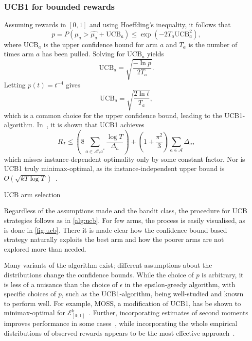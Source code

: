 \subsubsection{UCB1 for bounded rewards}
Assuming rewards in $[0,1]$ and using Hoeffding's inequality, it follows that
\begin{equation}
    p
    = P(\mu_a > \hat{\mu_a} + \text{UCB}_a)
    \leq \exp(-2T_a \text{UCB}_a^2),
\end{equation}
where $\text{UCB}_a$ is the upper confidence bound for arm $a$ and $T_a$ is the number of times arm $a$ has been pulled.
Solving for $\text{UCB}_a$ yields
\begin{equation}
    \text{UCB}_a = \sqrt{\frac{-\ln p}{2T_a}}.
\end{equation}
Letting $p(t) = t^{-4}$ gives
\begin{equation}
    \text{UCB}_a = \sqrt{\frac{2 \ln t}{T_a}},
\end{equation}
which is a common choice for the upper confidence bound, leading to the UCB1-algorithm.
In~\autocite{auer2002}, it is shown that UCB1 achieves
\begin{equation}
    R_T
    \leq
    \left( 8 \sum_{a \in \mathcal{A} \setminus a^*} \frac{\log T}{\Delta_a} \right)
    + \left(1 + \frac{\pi^2}{3}\right) \sum_{a \in \mathcal{A}} \Delta_a,
\end{equation}
which misses instance-dependent optimality only by some constant factor.
Nor is UCB1 truly minimax-optimal, as its instance-independent upper bound is $O(\sqrt{kT \log T})$~\autocite{bubeck2012}.

\begin{algorithm}
    \caption{UCB arm selection}
    \label{alg:ucb}
     
\end{algorithm}


Regardless of the assumptions made and the bandit class, the procedure for UCB strategies follows as in \cref{alg:ucb}.
For few arms, the process is easily visualised, as is done in \cref{fig:ucb}.
There it is made clear how the confidence bound-based strategy naturally exploits the best arm and how the poorer arms are not explored more than needed.

Many variants of the algorithm exist; different assumptions about the distributions change the confidence bounds.
While the choice of $p$ is arbitrary, it is less of a nuisance than the choice of $\epsilon$ in the epsilon-greedy algorithm, with specific choices of $p$, such as the UCB1-algorithm, being well-studied and known to perform well.
For example, MOSS, a modification of UCB1, has be shown to minimax-optimal for $\mathcal{E}_{[0,1]}^k$~\autocite{audibert2009}.
Further, incorporating estimates of second moments improves performance in some cases~\autocite{audibert2009a}, while incorporating the whole empirical distributions of observed rewards appears to be the most effective approach~\autocite{maillard2011}.





